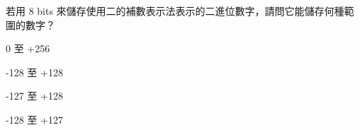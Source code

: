 \ifx\ntpcNinetyThree\undefined[93學年基北區] \fi
若用 8 bits 來儲存使用二的補數表示法表示的二進位數字，請問它能儲存何種範圍的數字？
  \begin{optionlist}
  \item 0 至 +256
  \item -128 至 +128
  \item -127 至 +128
  \item -128 至 +127\label{ntpc-93-a17}
  \end{optionlist}